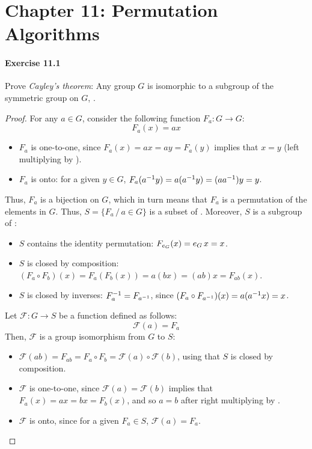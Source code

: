 \section*{Chapter 11: Permutation Algorithms}

\paragraph{Exercise 11.1}
Prove \textsl{Cayley's theorem}: Any group $G$ is isomorphic to a subgroup of
the symmetric group on $G$, .

\begin{proof}

For any $a \in G$, consider the following function $F_a: G \rightarrow G$:
$$F_a(x) = a x$$
\begin{itemize}
    \item $F_a$ is one-to-one, since $F_a(x) = a x = a y = F_a(y)$ implies 
    that $x = y$ (left multiplying by ).
    \item $F_a$ is onto: for a given $y \in G$, $F_a(a^{-1} y) = a (a^{-1} y)
    = (a a^{-1}) y = y$.
\end{itemize}
Thus, $F_a$ is a bijection on $G$, which in turn means that $F_a$ is a permutation
of the elements in $G$. Thus, $S = \{ F_a \, / \, a \in G \}$ is a subset of .
Moreover, $S$ is a subgroup of :
\begin{itemize}
    \item $S$ contains the identity permutation: $F_{e_{G}}(x) = e_{G} \, x = x$.
    \item $S$ is closed by composition: $(F_a \circ F_b)(x) = F_a(F_b(x)) = a (b x)
    = (a b) x = F_{ab}(x)$.
    \item $S$ is closed by inverses: $F_a^{-1} = F_{a^{-1}}$, since
    $(F_a \circ F_{a^{-1}})(x) = a (a^{-1} x) = x$.
\end{itemize}
Let $\mathcal{F} : G \rightarrow S$  be a function defined as follows:
$$\mathcal{F}(a) = F_a$$
Then, $\mathcal{F}$ is a group isomorphism from $G$ to $S$:
\begin{itemize}
    \item $\mathcal{F}(ab) = F_{ab} = F_a \circ F_b =
    \mathcal{F}(a) \circ \mathcal{F}(b)$, using that $S$ is closed by composition.
    \item $\mathcal{F}$ is one-to-one, since $\mathcal{F}(a) = \mathcal{F}(b)$
    implies that $F_a(x) = a x = b x = F_b(x)$, and so $a = b$ after right
    multiplying by .
    \item $\mathcal{F}$ is onto, since for a given $F_a \in S$, $\mathcal{F}(a) = F_a$.
\end{itemize}
\end{proof}

